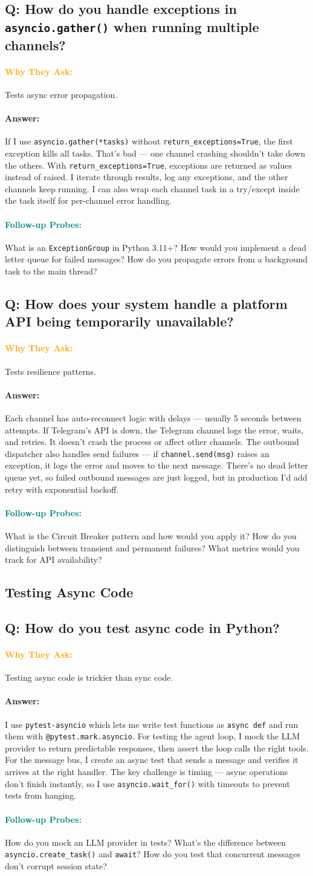 \documentclass[11pt,a4paper]{article}
\newcommand{\Q}[1]{\subsection{#1}}
\newcommand{\Ans}[1]{\paragraph{\textbf{Answer:}} #1}
\newcommand{\Why}{\paragraph{\textcolor{orange}{\textbf{Why They Ask:}}}}
\newcommand{\Probe}{\paragraph{\textcolor{teal}{\textbf{Follow-up Probes:}}}}
\begin{document}
\Q{Q: How do you handle exceptions in \texttt{asyncio.gather()} when running multiple channels?}
\Why Tests async error propagation.
\Ans If I use \texttt{asyncio.gather(*tasks)} without \texttt{return\_exceptions=True}, the first exception kills all tasks. That's bad --- one channel crashing shouldn't take down the others. With \texttt{return\_exceptions=True}, exceptions are returned as values instead of raised. I iterate through results, log any exceptions, and the other channels keep running. I can also wrap each channel task in a try/except inside the task itself for per-channel error handling.
\Probe What is an \texttt{ExceptionGroup} in Python 3.11+? How would you implement a dead letter queue for failed messages? How do you propagate errors from a background task to the main thread?

\Q{Q: How does your system handle a platform API being temporarily unavailable?}
\Why Tests resilience patterns.
\Ans Each channel has auto-reconnect logic with delays --- usually 5 seconds between attempts. If Telegram's API is down, the Telegram channel logs the error, waits, and retries. It doesn't crash the process or affect other channels. The outbound dispatcher also handles send failures --- if \texttt{channel.send(msg)} raises an exception, it logs the error and moves to the next message. There's no dead letter queue yet, so failed outbound messages are just logged, but in production I'd add retry with exponential backoff.
\Probe What is the Circuit Breaker pattern and how would you apply it? How do you distinguish between transient and permanent failures? What metrics would you track for API availability?

\subsection{Testing Async Code}

\Q{Q: How do you test async code in Python?}
\Why Testing async code is trickier than sync code.
\Ans I use \texttt{pytest-asyncio} which lets me write test functions as \texttt{async def} and run them with \texttt{@pytest.mark.asyncio}. For testing the agent loop, I mock the LLM provider to return predictable responses, then assert the loop calls the right tools. For the message bus, I create an async test that sends a message and verifies it arrives at the right handler. The key challenge is timing --- async operations don't finish instantly, so I use \texttt{asyncio.wait\_for()} with timeouts to prevent tests from hanging.
\Probe How do you mock an LLM provider in tests? What's the difference between \texttt{asyncio.create\_task()} and \texttt{await}? How do you test that concurrent messages don't corrupt session state?
\end{document}
